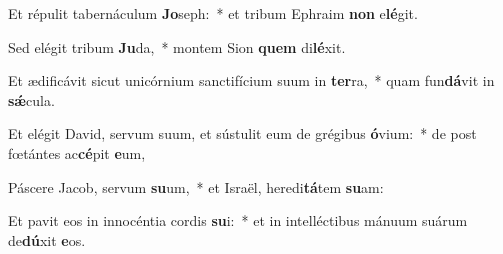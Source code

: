 \item Et répulit tabernáculum \textbf{Jo}seph:~* et tribum Ephraim \textbf{non} e\textbf{lé}git.
\item Sed elégit tribum \textbf{Ju}da,~* montem Sion \textbf{quem} di\textbf{lé}xit.
\item Et ædificávit sicut unicórnium sanctifícium suum in \textbf{ter}ra,~* quam fun\textbf{dá}vit in \textbf{sǽ}cula.
\item Et elégit David, servum suum, et sústulit eum de grégibus \textbf{ó}vium:~* de post fœtántes ac\textbf{cé}pit \textbf{e}um,
\item Páscere Jacob, servum \textbf{su}um,~* et Israël, heredi\textbf{tá}tem \textbf{su}am:
\item Et pavit eos in innocéntia cordis \textbf{su}i:~* et in intelléctibus mánuum suárum de\textbf{dú}xit \textbf{e}os.
